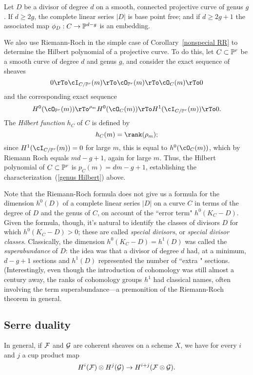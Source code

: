\begin{corollary}\label{degree 2g+1 embedding}
Let $D$ be a divisor of degree $d$ on a smooth, connected projective curve of genus $g$. If $d \geq 2g$, the complete linear series $|D|$ is base point free; and if $d \geq 2g+1$ the associated map $\phi_D : C \to \PP^{d-g}$ is an embedding.
\end{corollary}

We also use Riemann-Roch in the simple case of Corollary~\ref{nonspecial RR} to determine the Hilbert polynomial of a projective curve. To do this, let $C \subset \PP^r$ be a smooth curve of degree $d$ and genus $g$, and consider the exact sequence of sheaves
$$
0 \rTo \cI_{C/\PP^r}(m) \rTo \cO_{\PP^r}(m) \rTo \cO_C(m) \rTo 0
$$
and the corresponding exact sequence
$$
 H^0(\cO_{\PP^r}(m)) \rTo^{\rho_m} H^0(\cO_C(m)) \rTo H^1(\cI_{C/\PP^r}(m)) \rTo 0.
$$
The \emph{Hilbert function} $h_C$ of $C$  is defined by
$$
h_C(m) = \rank(\rho_m);
$$
 since $H^1(\cI_{C/\PP^r}(m)) = 0$ for large $m$, this is equal to $h^0(\cO_C(m))$, which by Riemann Roch equals $md-g+1$, again for large $m$. Thus, the Hilbert polynomial of $C \subset \PP^r$ is $p_C(m) = dm-g+1$, establishing the characterization~(\ref{genus Hilbert}) above.
 
 Note that the Riemann-Roch formula does not give us a formula for the dimension $h^0(D)$ of a complete linear series $|D|$ on a curve $C$ in terms of the degree of $D$ and the genus of $C$, on account of the ``error term" $h^0(K_C - D)$. Given the formula, though, it's natural to identify the classes of divisors $D$ for which $h^0(K_C - D)>0$; these are called \emph{special divisors}, or \emph{special divisor classes}. Classically, the dimension $h^0(K_C-D) = h^1(D)$ was called the \emph{superabundance} of $D$: the idea was that a divisor of degree $d$ had, at a minimum, $d-g+1$ sections and $h^1(D)$ represented the number of ``extra " sections. (Interestingly, even though the introduction of cohomology was still almost a century away, the ranks of cohomology groups $h^1$ had classical names, often involving the term superabundance---a premonition of the Riemann-Roch theorem in general.

\subsection{Serre duality}

In general, if $\cF$ and $\cG$ are coherent sheaves on a scheme $X$, we have for every $i$ and $j$ a cup product map
$$
H^i(\cF) \otimes H^j(\cG) \to H^{i+j}(\cF \otimes \cG).
$$

